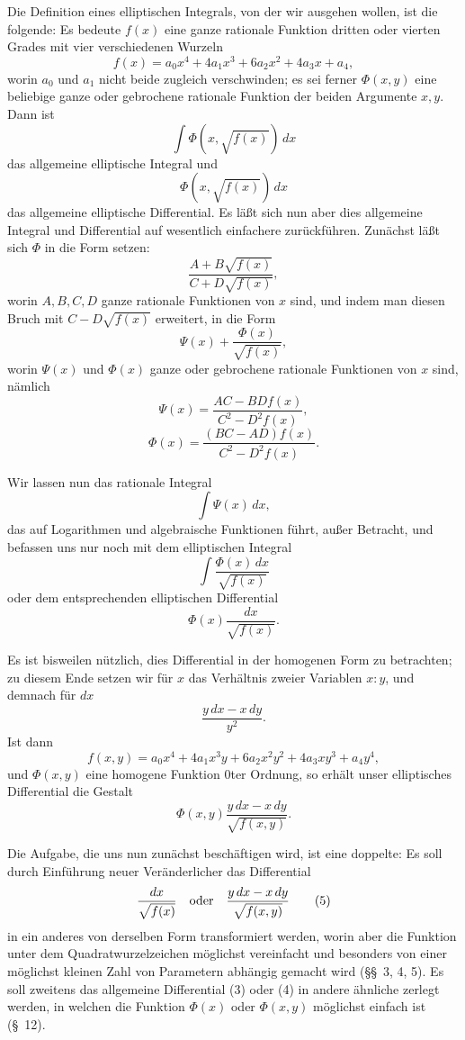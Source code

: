 \documentclass[11pt]{article}
\begin{document}
Die Definition eines elliptischen Integrals, von der wir ausgehen wollen, ist die folgende: Es bedeute $f(x)$ eine ganze rationale Funktion dritten oder vierten Grades mit vier verschiedenen Wurzeln
\begin{equation}
f(x)=a_0x^4+4a_1x^3+6a_2x^2+4a_3x+a_4,
\tag{1}
\end{equation}
worin $a_0$ und $a_1$ nicht beide zugleich verschwinden; es sei ferner $\Phi(x,y)$ eine beliebige ganze oder gebrochene rationale Funktion der beiden Argumente $x,y$. Dann ist
\[
\int \Phi(x,\sqrt{f(x)})\,dx
\]
das allgemeine elliptische Integral und
\[
\Phi(x,\sqrt{f(x)})\,dx
\]
das allgemeine elliptische Differential. Es läßt sich nun aber dies allgemeine Integral und Differential auf wesentlich einfachere zurückführen. Zunächst läßt sich $\Phi$ in die Form setzen:
\[
\frac{A+B\sqrt{f(x)}}{C+D\sqrt{f(x)}},
\]
worin $A,B,C,D$ ganze rationale Funktionen von $x$ sind, und indem man diesen Bruch mit $C-D\sqrt{f(x)}$ erweitert, in die Form
\[
\Psi(x)+\frac{\Phi(x)}{\sqrt{f(x)}},
\]
worin $\Psi(x)$ und $\Phi(x)$ ganze oder gebrochene rationale Funktionen von $x$ sind, nämlich
\[
\Psi(x)=\frac{AC-BD f(x)}{C^2-D^2 f(x)},
\]
\[
\Phi(x)=\frac{(BC-AD)f(x)}{C^2-D^2 f(x)}.
\]

Wir lassen nun das rationale Integral
\[
\int \Psi(x)\,dx,
\]
das auf Logarithmen und algebraische Funktionen führt, außer Betracht, und befassen uns nur noch mit dem elliptischen Integral
\begin{equation}
\int \frac{\Phi(x)\,dx}{\sqrt{f(x)}}
\tag{2}
\end{equation}
oder dem entsprechenden elliptischen Differential
\begin{equation}
\Phi(x)\frac{dx}{\sqrt{f(x)}}.
\tag{3}
\end{equation}

Es ist bisweilen nützlich, dies Differential in der homogenen Form zu betrachten; zu diesem Ende setzen wir für $x$ das Verhältnis zweier Variablen $x:y$, und demnach für $dx$
\[
\frac{y\,dx-x\,dy}{y^2}.
\]
Ist dann
\[
f(x,y)=a_0x^4+4a_1x^3y+6a_2x^2y^2+4a_3xy^3+a_4y^4,
\]
und $\Phi(x,y)$ eine homogene Funktion $0$ter Ordnung, so erhält unser elliptisches Differential die Gestalt
\begin{equation}
\Phi(x,y)\frac{y\,dx-x\,dy}{\sqrt{f(x,y)}}.
\tag{4}
\end{equation}

Die Aufgabe, die uns nun zunächst beschäftigen wird, ist eine doppelte: Es soll durch Einführung neuer Veränderlicher das Differential
\begin{equation}
\frac{dx}{\sqrt{f(x)}}\quad\hbox{oder}\quad \frac{y\,dx-x\,dy}{\sqrt{f(x,y)}}
\tag{5}
\end{equation}
in ein anderes von derselben Form transformiert werden, worin aber die Funktion unter dem Quadratwurzelzeichen möglichst vereinfacht und besonders von einer möglichst kleinen Zahl von Parametern abhängig gemacht wird (\S\S~3, 4, 5). Es soll zweitens das allgemeine Differential (3) oder (4) in andere ähnliche zerlegt werden, in welchen die Funktion $\Phi(x)$ oder $\Phi(x,y)$ möglichst einfach ist (\S~12).
\end{document}
